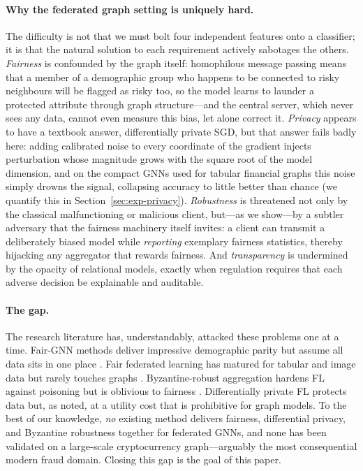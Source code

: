 \paragraph{Why the federated graph setting is uniquely hard.}
The difficulty is not that we must bolt four independent features onto a
classifier; it is that the natural solution to each requirement actively
sabotages the others. \emph{Fairness} is confounded by the graph itself:
homophilous message passing means that a member of a demographic group who
happens to be connected to risky neighbours will be flagged as risky too, so the
model learns to launder a protected attribute through graph structure---and the
central server, which never sees any data, cannot even measure this bias, let
alone correct it. \emph{Privacy} appears to have a textbook answer,
differentially private SGD, but that answer fails badly here: adding calibrated
noise to every coordinate of the gradient injects perturbation whose magnitude
grows with the square root of the model dimension, and on the compact GNNs used
for tabular financial graphs this noise simply drowns the signal, collapsing
accuracy to little better than chance (we quantify this in
Section~\ref{sec:exp-privacy}). \emph{Robustness} is threatened not only by the
classical malfunctioning or malicious client, but---as we show---by a subtler
adversary that the fairness machinery itself invites: a client can transmit a
deliberately biased model while \emph{reporting} exemplary fairness statistics,
thereby hijacking any aggregator that rewards fairness. And \emph{transparency}
is undermined by the opacity of relational models, exactly when regulation
requires that each adverse decision be explainable and auditable.

\paragraph{The gap.}
The research literature has, understandably, attacked these problems one at a
time. Fair-GNN methods deliver impressive demographic parity but assume all data
sits in one place \cite{dai2021say,yang2024fairsin,lee2025dabgnn}. Fair federated
learning has matured for tabular and image data but rarely touches graphs
\cite{ezzeldin2023fairfed,li2020fair}. Byzantine-robust aggregation hardens FL
against poisoning but is oblivious to fairness \cite{blanchard2017krum,
yin2018byzantine}. Differentially private FL protects data but, as noted, at a
utility cost that is prohibitive for graph models. To the best of our knowledge,
\emph{no} existing method delivers fairness, differential privacy, and Byzantine
robustness together for federated GNNs, and none has been validated on a
large-scale cryptocurrency graph---arguably the most consequential modern fraud
domain. Closing this gap is the goal of this paper.

